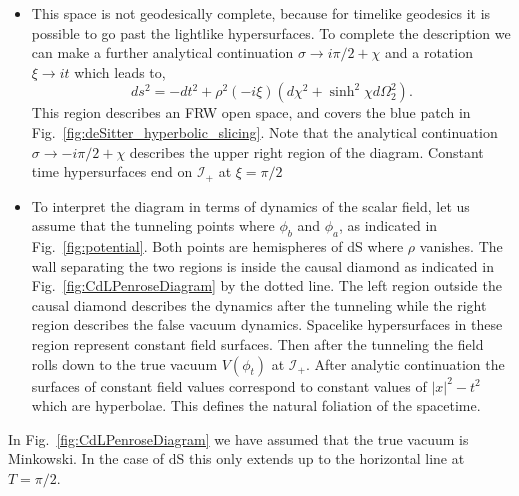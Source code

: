 \documentclass[a4paper,11pt]{article}
\numberwithin{equation}{section}
\begin{document}
\begin{itemize}
\item This space is not geodesically complete, because for timelike geodesics it is possible to go past the lightlike hypersurfaces. To complete the description we can make a further analytical continuation $\sigma\to i \pi/2+\chi$ and a rotation $\xi\to it$ which leads to,
\begin{equation}
ds^2=-dt^2+\rho^2(-i \xi)(d\chi^2+\sinh^2\chi d\Omega_2^2).
\end{equation}
This region describes an  FRW open space, and covers the blue patch in Fig.~\ref{fig:deSitter_hyperbolic_slicing}. Note that  the analytical continuation  $\sigma\to -i \pi/2+\chi$  describes the upper right region of the diagram.    Constant time hypersurfaces end on  $\mathscr{I}_+$ at $\xi=\pi/2$




\item To  interpret the diagram in terms of dynamics of the scalar field, let us assume that the tunneling points where $\phi_b$ and $\phi_a$, as indicated in Fig.~\ref{fig:potential}. Both points are hemispheres of dS where $\rho$ vanishes. The wall  separating the two regions is inside the causal diamond as indicated in Fig.~\ref{fig:CdLPenroseDiagram} by the dotted line. The  left region outside the causal diamond describes the dynamics after the tunneling while the right region describes the false vacuum dynamics.  Spacelike hypersurfaces in these region  represent  constant field surfaces.  Then after the tunneling the field rolls down to the true vacuum $V(\phi_t)$ at ${\mathcal I}_+$.
After analytic continuation the surfaces of constant field values correspond to constant values of $|x|^2-t^2$ which are hyperbolae. This defines the natural foliation of the spacetime.
\end{itemize}

In Fig.~\ref{fig:CdLPenroseDiagram} we have assumed that the true vacuum is Minkowski.  In the case of dS  this only extends up to the horizontal line at $T=\pi/2$.
\end{document}
